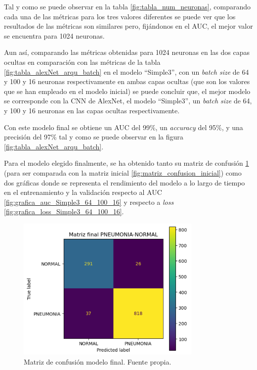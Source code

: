 Tal y como se puede observar en la tabla \ref{fig:tabla_num_neuronas}, comparando cada una de las métricas para los tres valores diferentes se puede ver que los resultados de las métricas son similares pero, fijándonos en el AUC, el mejor valor se encuentra para 1024 neuronas.

Aun así, comparando las métricas obtenidas para 1024 neuronas en las dos capas ocultas en comparación con las métricas de la tabla \ref{fig:tabla_alexNet_arqu_batch} en el modelo ``Simple3'', con un \textit{batch size} de 64 y 100 y 16 neuronas respectivamente en ambas capas ocultas (que son los valores que se han empleado en el modelo inicial) se puede concluir que, el mejor modelo se corresponde con la CNN de AlexNet, el modelo ``Simple3'', un \textit{batch size} de 64, y 100 y 16 neuronas en las capas ocultas respectivamente.

Con este modelo final se obtiene un AUC del 99\%, un \textit{accuracy} del 95\%, y una precisión del 97\% tal y como se puede observar en la figura \ref{fig:tabla_alexNet_arqu_batch}.

Para el modelo elegido finalmente, se ha obtenido tanto su matriz de confusión \ref{fig:matriz_conf_final} (para ser comparada con la matriz inicial \ref{fig:matriz_confusion_inicial}) como dos gráficas donde se representa el rendimiento del modelo a lo largo de tiempo en el entrenamiento y la validación respecto al AUC \ref{fig:grafica_auc_Simple3_64_100_16} y respecto a \textit{loss} \ref{fig:grafica_loss_Simple3_64_100_16}.  

\begin{figure}[h]
    \centering
    \includegraphics[width=0.80\textwidth]{img/matriz_conf_final.PNG}
    \caption{Matriz de confusión modelo final. Fuente propia.}
    \label{fig:matriz_conf_final}
\end{figure}

